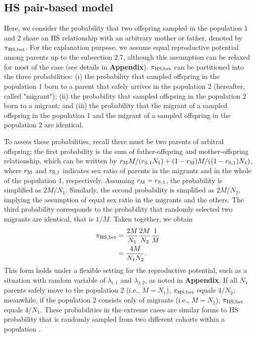\documentclass[12pt, English]{article}
\begin{document}
\begin{spacing}{1.9}
\subsection{HS pair-based model}

Here, we consider the probability that two offspring sampled in the population 1 and 2 share an HS relationship with an arbitrary mother or father, denoted by $\pi_{\rm HS, bet}$. For the explanation purpose, we assume equal reproductive potential among parents up to the subsection 2.7, although this assumption can be relaxed for most of the case (see details in {\bf Appendix}). $\pi_{\rm HS, bet}$ can be partitioned into the three probabilities: (i) the probability that sampled offspring in the population 1 born to a parent that safely arrives in the population 2 (hereafter, called "migrant"); (ii) the probability that sampled offspring in the population 2 born to a migrant; and (iii) the probability that the migrant of a sampled offspring in the population 1 and the migrant of a sampled offspring in the population 2 are identical. 

To assess these probabilities, recall there must be two parents of arbitral offspring; the first probability is the sum of father-offspring and mother-offspring relationship, which can be written by $r_{\rm M}M/(r_{\rm S,1}N_{1}) + (1 - r_{\rm M})M/((1-r_{\rm S,1})N_{1})$, where $r_{\rm M}$ and $r_{\rm S,1}$ indicates sex ratio of parents in the migrants and in the whole of the population 1, respectively. Assuming $r_{\rm M} = r_{\rm S,1}$, the probability is simplified as $2M/N_{1}$. Similarly, the second probability is simplified as $2M/N_{2}$, implying the assumption of equal sex ratio in the migrants and the others. The third probability corresponds to the probability that randomly selected two migrants are identical, that is $1/M$. Taken together, we obtain
\begin{align}
\pi_{\rm HS,bet} &= \frac{2M}{N_{1}} \frac{2M}{N_{2}} \frac{1}{M} \nonumber\\
&= \frac{4M}{N_{1}N_{2}}.
\label{HS-1}
\end{align}
This form holds under a flexible setting for the reproductive potential, such as a situation with random variable of $\lambda_{i,1}$ and $\lambda_{j,2}$, as noted in {\bf Appendix}. If all $N_1$ parents safely move to the population 2 (i.e., $M = N_1$), $\pi_{\rm HS,bet}$ equals $4/N_2$; meanwhile, if the population 2 consists only of migrants (i.e., $M = N_2$), $\pi_{\rm HS,bet}$ equals $4/N_1$. These probabilities in the extreme cases are similar forms to HS probability that is randomly sampled from two different cohorts within a population \cite[]{bravington2016close}. 


\end{spacing}
\end{document}
